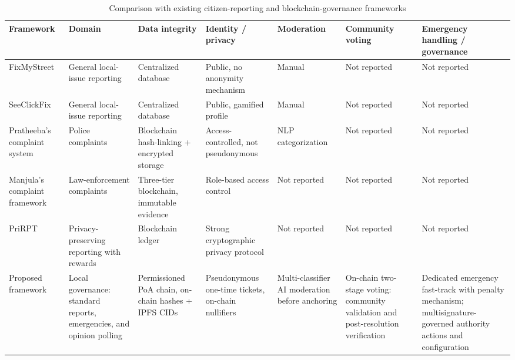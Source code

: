 \begin{landscape}
\begin{table}[htb]
\centering
\caption{Comparison with existing citizen-reporting and blockchain-governance frameworks}
\label{tab:framework-comparison}
\begin{tabular}{p{}|p{}|p{}|p{}|p{}|p{}|p{}}

    Framework & Domain & Data integrity & Identity / privacy & Moderation & Community voting & Emergency handling / governance \\
    \hline
    FixMyStreet \cite{Matthews2018} & General local-issue reporting & Centralized database & Public, no anonymity mechanism & Manual & Not reported & Not reported \\
    \hline
    SeeClickFix \cite{seeclickfix2011democracy} & General local-issue reporting & Centralized database & Public, gamified profile & Manual & Not reported & Not reported \\
    \hline
    Pratheeba's complaint system \cite{pratheeba_blockchain_police_complaint} & Police complaints & Blockchain hash-linking + encrypted storage & Access-controlled, not pseudonymous & \ac{NLP} categorization & Not reported & Not reported \\
    \hline
    Manjula's complaint framework \cite{manjula2025decentralized} & Law-enforcement complaints & Three-tier blockchain, immutable evidence & Role-based access control & Not reported & Not reported & Not reported \\
    \hline
    PriRPT \cite{lin2023prirpt} & Privacy-preserving reporting with rewards & Blockchain ledger & Strong cryptographic privacy protocol & Not reported & Not reported & Not reported \\
    \hline
    Proposed framework &   {Local governance: standard reports, emergencies, and opinion polling} &   {Permissioned PoA chain, on-chain hashes + IPFS \ac{CID}s} &   {Pseudonymous one-time tickets, on-chain nullifiers} &   {Multi-classifier AI moderation before anchoring} &   {On-chain two-stage voting: community validation and post-resolution verification} &   {Dedicated emergency fast-track with penalty mechanism; multisignature-governed authority actions and configuration} \\

\end{tabular}
\end{table}
\end{landscape}
    
